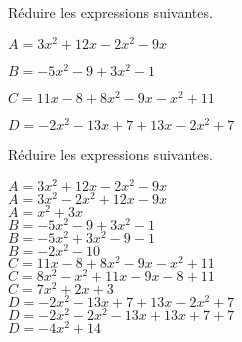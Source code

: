 \begin{exercice*}
    Réduire les expressions suivantes.    
    \begin{itemize}
        \begin{spacing}{1.2}
            \item[] $A=3x^2+12x-2x^2-9x$
            \item[] $B=-5x^2-9+3x^2-1$
            \item[] $C=11x-8+8x^2-9x-x^2+11$
            \item[] $D=-2x^2-13x+7+13x-2x^2+7$
        \end{spacing}
    \end{itemize}
\end{exercice*}
\begin{corrige}
    Réduire les expressions suivantes.    
    \begin{itemize}
        \def\item{}
        \item $A=3x^2+12x-2x^2-9x$\\
        {\red $A=3x^2-2x^2+12x-9x$\\
        $A=x^2+3x$\\\smallskip
        }
        \item $B=-5x^2-9+3x^2-1$\\
        {\red $B=-5x^2+3x^2-9-1$\\
        $B=-2x^2-10$\\\smallskip
        }
        \item $C=11x-8+8x^2-9x-x^2+11$\\
        {\red $C=8x^2-x^2+11x-9x-8+11$\\
        $C=7x^2+2x+3$\\\smallskip
        }
        \item $D=-2x^2-13x+7+13x-2x^2+7$\\
        {\red $D=-2x^2-2x^2-13x+13x+7+7$\\
        $D=-4x^2+14$
        }
    \end{itemize}
\end{corrige}

